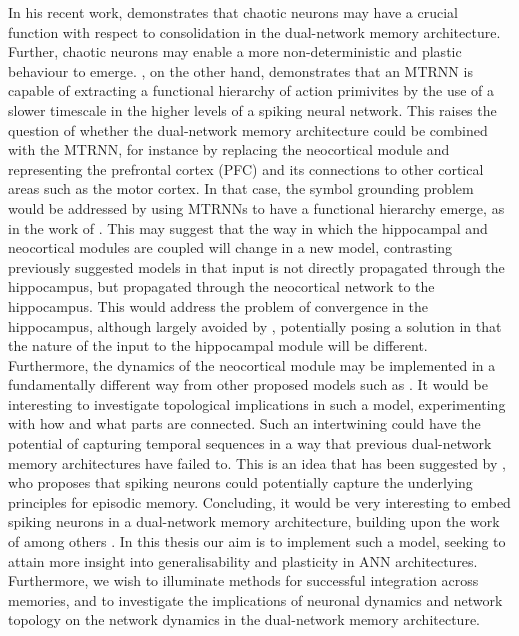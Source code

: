 In his recent work, \cite{Hattori2014} demonstrates that chaotic neurons may have a crucial function with respect to consolidation in the dual-network memory architecture. Further, chaotic neurons may enable a more non-deterministic and plastic behaviour to emerge. \cite{Tani2014}, on the other hand, demonstrates that an MTRNN is capable of extracting a functional hierarchy of action primivites by the use of a slower timescale in the higher levels of a spiking neural network. This raises the question of whether the dual-network memory architecture could be combined with the MTRNN, for instance by replacing the neocortical module and representing the prefrontal cortex (PFC) and its connections to other cortical areas such as the motor cortex. In that case, the symbol grounding problem would be addressed by using MTRNNs to have a functional hierarchy emerge, as in the work of \cite{Tani2014}. This may suggest that the way in which the hippocampal and neocortical modules are coupled will change in a new model, contrasting previously suggested models in that input is not directly propagated through the hippocampus, but propagated through the neocortical network to the hippocampus.
This would address the problem of convergence in the hippocampus, although largely avoided by \cite{Hattori2014}, potentially posing a solution in that the nature of the input to the hippocampal module will be different. Furthermore, the dynamics of the neocortical module may be implemented in a fundamentally different way from other proposed models such as \cite{Ans1997, Ans2000, French2001, Hattori2010, Hattori2014}. 
It would be interesting to investigate topological implications in such a model, experimenting with how and what parts are connected.
Such an intertwining could have the potential of capturing temporal sequences in a way that previous dual-network memory architectures have failed to. This is an idea that has been suggested by \cite{Hattori2014}, who proposes that spiking neurons could potentially capture the underlying principles for episodic memory. Concluding, it would be very interesting to embed spiking neurons in a dual-network memory architecture, building upon the work of among others \cite{Yamashita2008, McClelland1995, Hattori2014}. In this thesis our aim is to implement such a model, seeking to attain more insight into generalisability and plasticity in ANN architectures. Furthermore, we wish to illuminate methods for successful integration across memories, and to investigate the implications of neuronal dynamics and network topology on the network dynamics in the dual-network memory architecture.


\cleardoublepage